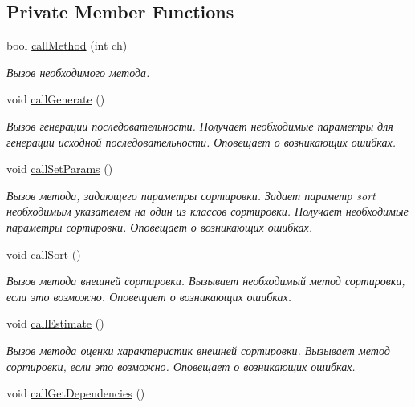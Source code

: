 \subsection*{Private Member Functions}
\begin{DoxyCompactItemize}
\item 
bool \hyperlink{class_user_interface_ad388ff348c0a124038f4ea9756b80041}{call\+Method} (int ch)
\begin{DoxyCompactList}\small\item\em Вызов необходимого метода. \end{DoxyCompactList}\item 
void \hyperlink{class_user_interface_a27c547dadfd5588d5b734e253b2e8a4a}{call\+Generate} ()
\begin{DoxyCompactList}\small\item\em Вызов генерации последовательности. Получает необходимые параметры для генерации исходной последовательности. Оповещает о возникающих ошибках. \end{DoxyCompactList}\item 
void \hyperlink{class_user_interface_adcabf6c8f2be4b4ec712c4674156bf59}{call\+Set\+Params} ()
\begin{DoxyCompactList}\small\item\em Вызов метода, задающего параметры сортировки. Задает параметр sort необходимым указателем на один из классов сортировки. Получает необходимые параметры сортировки. Оповещает о возникающих ошибках. \end{DoxyCompactList}\item 
void \hyperlink{class_user_interface_a0e03dfecee7e890ad1e076888062d5cb}{call\+Sort} ()
\begin{DoxyCompactList}\small\item\em Вызов метода внешней сортировки. Вызывает необходимый метод сортировки, если это возможно. Оповещает о возникающих ошибках. \end{DoxyCompactList}\item 
void \hyperlink{class_user_interface_a7957201b3543ea0561d48bcc0a0d329e}{call\+Estimate} ()
\begin{DoxyCompactList}\small\item\em Вызов метода оценки характеристик внешней сортировки. Вызывает метод сортировки, если это возможно. Оповещает о возникающих ошибках. \end{DoxyCompactList}\item 
void \hyperlink{class_user_interface_a332db63dca89d684f7e9e1272f4c3745}{call\+Get\+Dependencies} ()

\end{DoxyCompactItemize}
